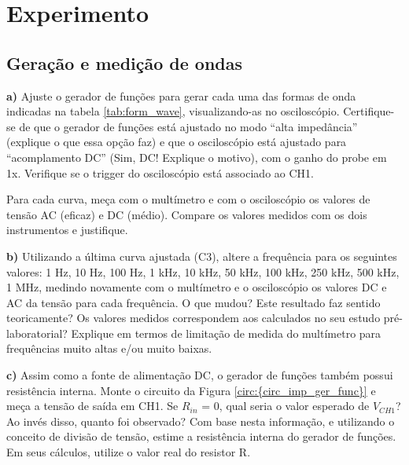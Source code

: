 \section{Experimento}

\subsection{Geração e medição de ondas}

\textbf{a)} Ajuste o gerador de funções para gerar cada uma das formas de onda indicadas na tabela \ref{tab:form_wave}, visualizando-as no
osciloscópio. Certifique-se de que o gerador de funções está ajustado no modo “alta impedância” (explique o que essa
opção faz) e que o osciloscópio está ajustado para “acomplamento DC” (Sim, DC! Explique o motivo), com o ganho do
probe em 1x. Verifique se o trigger do osciloscópio está associado ao CH1.

Para cada curva, meça com o multímetro e com o osciloscópio os valores de tensão AC (eficaz) e DC (médio). Compare
os valores medidos com os dois instrumentos e justifique.

\noindent \textbf{b)} Utilizando a última curva ajustada (C3), altere a frequência para os seguintes valores: 1 Hz, 10 Hz, 100 Hz, 1 kHz, 10
kHz, 50 kHz, 100 kHz, 250 kHz, 500 kHz, 1 MHz, medindo novamente com o multímetro e o osciloscópio os valores DC
e AC da tensão para cada frequência. O que mudou? Este resultado faz sentido teoricamente? Os valores medidos
correspondem aos calculados no seu estudo pré-laboratorial? Explique em termos de limitação de medida do multímetro
para frequências muito altas e/ou muito baixas.

\noindent \textbf{c)} Assim como a fonte de alimentação DC, o gerador de funções também possui resistência interna. Monte o circuito da
Figura \ref{circ:{circ_imp_ger_func}}  e meça a tensão de saída em CH1. Se $R_{in}$ = 0, qual seria o valor esperado de $V_{CH1}$? Ao invés disso, quanto foi
observado? Com base nesta informação, e utilizando o conceito de divisão de tensão, estime a resistência interna do gerador de funções. Em seus cálculos, utilize o valor real do resistor R.


